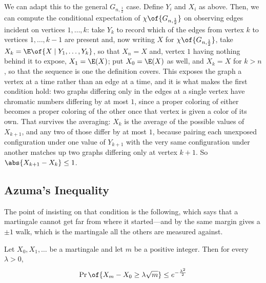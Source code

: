 We can adapt this to the general $G_{n, \frac{1}{2}}$ case. Define $Y_i$ and $X_i$ as above. Then, we can compute the conditional expectation of $\chi\of{G_{n, \frac{1}{2}}}$ on observing edges incident on vertices $1, \ldots, k$: take $Y_k$ to record which of the edges from vertex $k$ to vertices $1, \ldots, k-1$ are present and, now writing $X$ for $\chi\of{G_{n, \frac{1}{2}}}$, take $X_k = \E\of{X \mid Y_1, \ldots, Y_k}$, so that $X_n = X$ and, vertex $1$ having nothing behind it to expose, $X_1 = \E(X)$; put $X_0 = \E(X)$ as well, and $X_k = X$ for $k > n$, so that the sequence is one the definition covers. This exposes the graph a vertex at a time rather than an edge at a time, and it is what makes the first condition hold: two graphs differing only in the edges at a single vertex have chromatic numbers differing by at most $1$, since a proper coloring of either becomes a proper coloring of the other once that vertex is given a color of its own. That survives the averaging: $X_k$ is the average of the possible values of $X_{k+1}$, and any two of those differ by at most $1$, because pairing each unexposed configuration under one value of $Y_{k+1}$ with the very same configuration under another matches up two graphs differing only at vertex $k+1$. So $\abs{X_{k+1} - X_k} \leq 1$.

\subsection{Azuma's Inequality}

The point of insisting on that condition is the following, which says that a martingale cannot get far from where it started---and by the same margin  gives a $\pm 1$ walk, which is the martingale all the others are measured against.

\begin{boxtheorem} \label{Ch3:Thm:Azuma}
    Let $X_0, X_1, \ldots$ be a martingale and let $m$ be a positive integer. Then for every $\lambda > 0$,
    \begin{align*}
        \Pr\of{X_m - X_0 \geq \lambda \sqrt{m}} \leq e^{-\frac{\lambda^2}{2}}
    \end{align*}
\end{boxtheorem}

